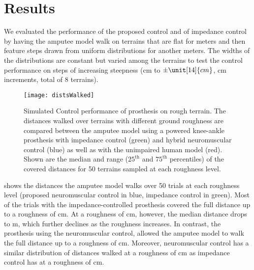 \section{Results}\label{sec:completed_comparison_results}

We evaluated the performance of the proposed control and of impedance control by
having the amputee model walk on terrains that are flat for \unit[10]{meters}
and then feature steps drawn from uniform distributions for another
\unit[90]{meters}. The widths of the distributions are constant but varied among
the terrains to test the control performance on steps of increasing steepness
(\unit[0]{cm} to $\pm \unit[14]{cm}$, \unit[2]{cm} increments, total of 8
terrains). 

\begin{figure}[t]
    \centering
    \texttt{[image: distsWalked]}
    \caption[Simulated control performance of prosthesis on rough
    terrain]{Simulated Control performance of prosthesis on rough terrain. The
    distances walked over terrains with different ground roughness are compared
    between the amputee model using a powered knee-ankle prosthesis with
    impedance control (green) and hybrid neuromuscular control (blue) as well as
    with the unimpaired human model (red). Shown are the median and range
    ($25^\textrm{th}$ and $75^\textrm{th}$ percentiles) of the covered distances
    for 50 terrains sampled at each roughness level.}\label{fig:distsWalked}
\end{figure}
 shows the distances the amputee model walks over 50
trials at each roughness level (proposed neuromuscular control in blue,
impedance control in green). Most of the trials with the impedance-controlled
prosthesis covered the full distance up to a roughness of \unit[2]{cm}. At a
roughness of \unit[4]{cm}, however, the median distance drops to \unit[34]{m},
which further declines as the roughness increases. In contrast, the prosthesis
using the neuromuscular control, allowed the amputee model to walk the full
distance up to a roughness of \unit[6]{cm}. Moreover, neuromuscular control has
a similar distribution of distances walked at a roughness of \unit[8]{cm} as
impedance control has at a roughness of \unit[4]{cm}.

